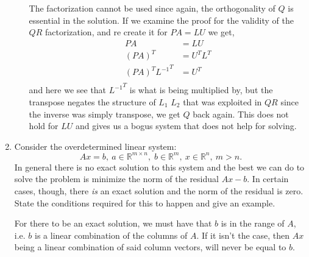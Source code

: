 \documentclass{article}
\newcommand{\rdim}[2]{\mathbb{R}^{#1 \times #2}}
\begin{document}
\begin{enumerate}
\begin{enumerate}
      The factorization cannot be used since again, the orthogonality of $Q$ is essential in the solution. If we examine the proof for the validity of the $QR$ factorization, and re create it for $PA = LU$ we get, 
      \begin{align*}
        PA &= LU \\
        (PA)^T &= U^TL^T \\
        (PA)^T {L^{-1}}^T &= U^T \\
      \end{align*}
      and here we see that ${L^{-1}}^T$ is what is being multiplied by, but the transpose negates the structure of $L_1$ $L_2$ that was exploited in $QR$ since the inverse was simply transpose, we get $Q$ back again. This does not hold for $LU$ and gives us a bogus system that does not help for solving. 
  \end{enumerate}
  \newpage
  \item Consider the overdetermined linear system:
  \[ Ax = b,\: a \in \rdim{m}{n}, \; b \in \mathbb{R}^m,\: x \in \mathbb{R}^n, \: m > n.\]
  In general there is no exact solution to this system and the best we can do to solve the problem is minimize the norm of the residual $Ax -b$. In certain cases, though, there \textit{is} an exact solution and the norm of the residual is zero. State the conditions required for this to happen and give an example.
  
  For there to be an exact solution, we must have that $b$ is in the range of $A$, i.e. $b$ is a linear combination of the columns of $A$. If it isn't the case, then $Ax$ being a linear combination of said column vectors, will never be equal to $b$.


\end{enumerate}
\end{document}
